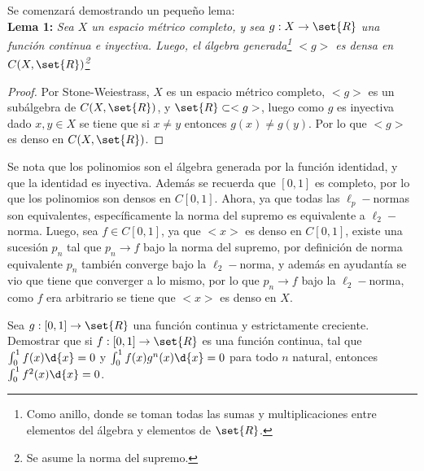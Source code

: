 \begin{sol}
    Se comenzará demostrando un pequeño lema:\\
    \textbf{Lema 1:} \textit{Sea \(X\) un espacio métrico completo, y sea \(g:X\rightarrow\set{R}\) una función continua e inyectiva. Luego, el álgebra generada\footnote{Como anillo, donde se toman todas las sumas y multiplicaciones entre elementos del álgebra y elementos de \(\set{R}\).} \(<g>\) es densa en \(C(X,\set{R})\)\footnote{Se asume la norma del supremo.}}
    \begin{proof}
        Por Stone-Weiestrass, \(X\) es un espacio métrico completo, \(<g>\) es un subálgebra de \(C(X,\set{R})\), y \(\set{R}\subset<g>\), luego como \(g\) es inyectiva dado \(x,y\in X\) se tiene que si \(x\neq y\) entonces \(g(x)\neq g(y)\). Por lo que \(<g>\) es denso en \(C(X,\set{R})\).
    \end{proof}
    \noindent Se nota que los polinomios son el álgebra generada por la función identidad, y que la identidad es inyectiva. Además se recuerda que \([0,1]\) es completo, por lo que los polinomios son densos en \(C[0,1]\). Ahora, ya que todas las \(\ell_p-\)normas son equivalentes, específicamente la norma del supremo es equivalente a \(\ell_2-\)norma. Luego, sea \(f\in C[0,1]\), ya que \(<x>\) es denso en \(C[0,1]\), existe una sucesión \(p_n\) tal que \(p_n\rightarrow f\) bajo la norma del supremo, por definición de norma equivalente \(p_n\) también converge bajo la \(\ell_2-\)norma, y además en ayudantía se vio que tiene que converger a lo mismo, por lo que \(p_n\rightarrow f\) bajo la \(\ell_2-\)norma, como \(f\) era arbitrario se tiene que \(<x>\) es denso en \(X\).
\end{sol}

\begin{prob}
    Sea \(g:[0,1]\rightarrow\set{R}\) una función continua y estrictamente creciente. Demostrar que si \(f:[0,1]\rightarrow\set{R}\) es una función continua, tal que \(\int_0^1f(x)\d{x}=0\) y \(\int_0^1f(x)g^n(x)\d{x}=0\) para todo \(n\) natural, entonces \(\int_0^1f^2(x)\d{x}=0\).
\end{prob}

